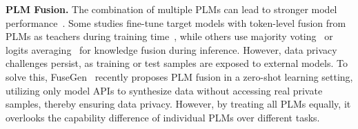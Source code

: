 \textbf{PLM Fusion.} The combination of multiple PLMs can lead to stronger model performance~\cite{liu2023dynamic,du2023improving,wan2024knowledge,wan2024fusechat,li2024more,zou2024fusegen}. Some studies fine-tune target models with token-level fusion from PLMs as teachers during training time~\cite{wan2024knowledge,wan2024fusechat}, while others use majority voting~\cite{li2024more} or logits averaging~\cite{mavromatis2024pack} for knowledge fusion during inference. 
However, data privacy challenges persist, as training or test samples are exposed to external models. To solve this, FuseGen~\cite{zou2024fusegen} recently proposes PLM fusion in a zero-shot learning setting, utilizing only model APIs to synthesize data without accessing real private samples, thereby ensuring data privacy. However, by treating all PLMs equally, it overlooks the capability difference of individual PLMs over different tasks.

